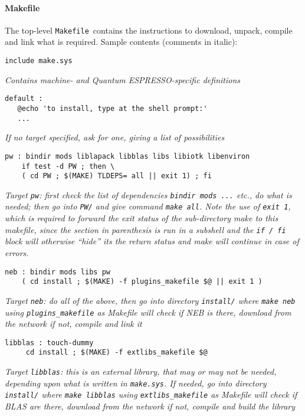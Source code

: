 \documentclass[12pt,a4paper]{article}
\def\qe{{\sc Quantum ESPRESSO}}
\def\Makefile{\texttt{Makefile}}
\begin{document}
\paragraph{Makefile}
The top-level \Makefile\ contains the instructions to download,
unpack, compile and link what is required. Sample contents
(comments in italic):
\begin{verbatim}
include make.sys
\end{verbatim}
{\em Contains machine- and \qe-specific definitions}
\begin{verbatim}
default :
   @echo 'to install, type at the shell prompt:'
   ...
\end{verbatim}
{\em If no target specified, ask for one, giving a list of possibilities}
\begin{verbatim}
pw : bindir mods liblapack libblas libs libiotk libenviron
    if test -d PW ; then \
    ( cd PW ; $(MAKE) TLDEPS= all || exit 1) ; fi

\end{verbatim}
{\em Target {\tt pw}: first check the list of dependencies {\tt bindir
mods ...} etc., do what is needed; then go into {\tt PW/} and give command
{\tt make all}. Note the use of {\tt exit 1}, which is required to forward
the exit status of the sub-directory make to this makefile, since the section
in parenthesis is run in a subshell and the {\tt if / fi} block will otherwise
``hide'' its the return status and make will continue in case of errors. }
\begin{verbatim}
neb : bindir mods libs pw
    ( cd install ; $(MAKE) -f plugins_makefile $@ || exit 1 )
\end{verbatim}
{\em Target {\tt neb}: do all of the above, then go into directory
{\tt install/} where {\tt make neb} using {\tt plugins\_makefile}
as Makefile will check if NEB is there, download from the network if not,
compile and link it}
\begin{verbatim}
libblas : touch-dummy
     cd install ; $(MAKE) -f extlibs_makefile $@
\end{verbatim}
{\em Target {\tt libblas}: this is an external library, that may or may
not be needed, depending upon what is written in {\tt make.sys}. If
needed, go into directory {\tt install/} where {\tt make libblas} using
{\tt extlibs\_makefile} as Makefile will check if BLAS are there, download
from the network if not,
compile and build the library}
\end{document}
